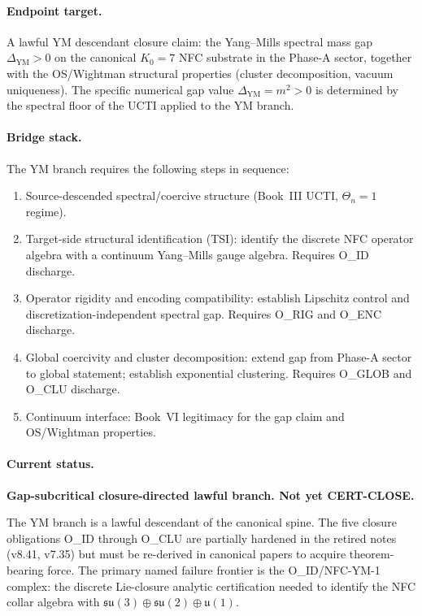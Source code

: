 \documentclass[12pt,oneside]{amsbook}
\theoremstyle{plain}
\theoremstyle{definition}
\theoremstyle{remark}
\begin{document}
\paragraph{Endpoint target.}
A lawful YM descendant closure claim: the Yang--Mills spectral mass
gap $\Delta_{\mathrm{YM}} > 0$ on the canonical $K_0=7$ NFC substrate
in the Phase-A sector, together with the OS/Wightman structural
properties (cluster decomposition, vacuum uniqueness). The specific
numerical gap value $\Delta_{\mathrm{YM}} = m^2 > 0$ is determined
by the spectral floor of the UCTI applied to the YM branch.

\paragraph{Bridge stack.}
The YM branch requires the following steps in sequence:
\begin{enumerate}[label=\textup{(\arabic*)}]
 \item Source-descended spectral/coercive structure (Book~III
 UCTI, $\Theta_n = 1$ regime).
 \item Target-side structural identification (TSI): identify the
 discrete NFC operator algebra with a continuum Yang--Mills
 gauge algebra. Requires O\_ID discharge.
 \item Operator rigidity and encoding compatibility: establish
 Lipschitz control and discretization-independent spectral
 gap. Requires O\_RIG and O\_ENC discharge.
 \item Global coercivity and cluster decomposition: extend gap
 from Phase-A sector to global statement; establish
 exponential clustering. Requires O\_GLOB and O\_CLU
 discharge.
 \item Continuum interface: Book~VI legitimacy for
 the gap claim and OS/Wightman properties.
\end{enumerate}

\paragraph{Current status.}
\textbf{Gap-subcritical closure-directed lawful branch. Not yet
CERT-CLOSE.}

The YM branch is a lawful descendant of the canonical spine. The
five closure obligations O\_ID through O\_CLU are partially
hardened in the retired notes (v8.41, v7.35) but must be
re-derived in canonical papers to acquire theorem-bearing force.
The primary named failure frontier is the O\_ID/NFC-YM-1 complex:
the discrete Lie-closure analytic certification needed to identify
the NFC collar algebra with $\mathfrak{su}(3)\oplus\mathfrak{su}(2)
\oplus\mathfrak{u}(1)$.
\end{document}
